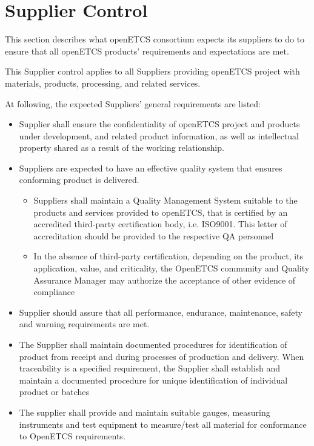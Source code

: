 \documentclass{template/openetcs_article}
\begin{document}
\section{Supplier Control}


This section describes what openETCS consortium expects its suppliers to do to
ensure that all openETCS products' requirements and expectations are met.

This Supplier control applies to all Suppliers providing openETCS project with materials, products, processing, and related services.

At following, the expected Suppliers' general requirements are listed:

\begin{itemize}
\item Supplier shall ensure the confidentiality of openETCS project and products under development, and related product information, as well as \gls{intellectual property} shared as a result of the working relationship.
\item Suppliers are expected to have an effective quality system that ensures conforming product is delivered.
\begin{itemize}
\item Suppliers shall maintain a Quality Management System suitable to the products and services provided to openETCS, that is certified by an accredited third-party certification body, i.e. ISO9001. This letter of accreditation should be provided to the respective QA personnel
\item In the absence of third-party certification, depending on the product, its application, value, and criticality, the OpenETCS community and Quality Assurance Manager may authorize the acceptance of other evidence of compliance
\end{itemize}
\item Supplier should assure that all performance, endurance, maintenance, safety and warning requirements are met.
\item The Supplier shall maintain documented procedures for identification of product from receipt and during processes of production and delivery. When traceability is a specified requirement, the Supplier shall establish and maintain a documented procedure for unique identification of individual product or batches
\item The supplier shall provide and maintain suitable gauges, measuring instruments and test equipment to measure/test all material for conformance to OpenETCS requirements.

\end{itemize}
\end{document}
